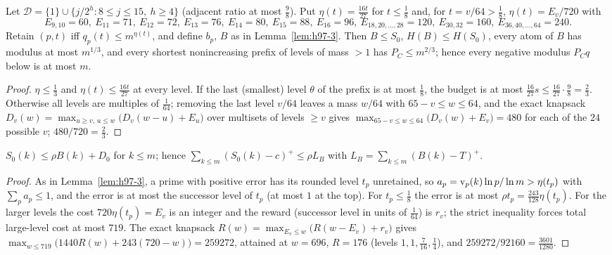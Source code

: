 \begin{lemma}\label{lem:h883-3}
Let $\mathcal D=\{1\}\cup\{j/2^h:8\le j\le15,\ h\ge4\}$ (adjacent ratio at most $\tfrac98$). Put
$\eta(t)=\tfrac{16t}{27}$ for $t\le\tfrac18$ and, for $t=v/64>\tfrac18$, $\eta(t)=E_v/720$ with
\[
E_{9,10}=60,\ E_{11}=71,\ E_{12}=72,\ E_{13}=76,\ E_{14}=80,\ E_{15}=88,\ E_{16}=96,\
E_{18,20,\dots,28}=120,\ E_{30,32}=160,\ E_{36,40,\dots,64}=240 .
\]
Retain $(p,t)$ iff $q_p(t)\le m^{\eta(t)}$, and define $b_p$, $B$ as in Lemma~\ref{lem:h97-3}. Then $B\le S_0$,
$H(B)\le H(S_0)$, every atom of $B$ has modulus at most $m^{1/3}$, and every shortest nonincreasing prefix of levels of
mass $>1$ has $P_C\le m^{2/3}$; hence every negative modulus $P_Cq$ below is at most $m$.
\end{lemma}
\begin{proof}
$\eta\le\tfrac13$ and $\eta(t)\le\tfrac{16t}{27}$ at every level. If the last (smallest) level $\theta$ of the prefix is
at most $\tfrac18$, the budget is at most $\tfrac{16}{27}s\le\tfrac{16}{27}\cdot\tfrac98=\tfrac23$. Otherwise all
levels are multiples of $\tfrac1{64}$; removing the last level $v/64$ leaves a mass $w/64$ with $65-v\le w\le64$, and
the exact knapsack $D_v(w)=\max_{u\ge v,\,u\le w}\bigl(D_v(w-u)+E_u\bigr)$ over multisets of levels $\ge v$ gives
$\max_{65-v\le w\le64}\bigl(D_v(w)+E_v\bigr)=480$ for each of the $24$ possible $v$; $480/720=\tfrac23$.
\end{proof}

\begin{lemma}\label{lem:h883-4}
$S_0(k)\le\rho B(k)+D_0$ for $k\le m$; hence $\sum_{k\le m}(S_0(k)-c)^+\le\rho L_B$ with
$L_B=\sum_{k\le m}(B(k)-T)^+$.
\end{lemma}
\begin{proof}
As in Lemma~\ref{lem:h97-3}, a prime with positive error has its rounded level $t_p$ unretained, so
$a_p=\operatorname{v}_p(k)\ln p/\ln m>\eta(t_p)$ with $\sum_pa_p\le1$, and the error is at most the successor level of $t_p$
(at most $1$ at the top). For $t_p\le\tfrac18$ the error is at most $\rho t_p=\tfrac{243}{128}\eta(t_p)$. For the
larger levels the cost $720\eta(t_p)=E_v$ is an integer and the reward (successor level in units of $\tfrac1{64}$) is
$r_v$; the strict inequality forces total large-level cost at most $719$. The exact knapsack
$R(w)=\max_{E_v\le w}\bigl(R(w-E_v)+r_v\bigr)$ gives $\max_{w\le719}\bigl(1440R(w)+243(720-w)\bigr)=259272$,
attained at $w=696$, $R=176$ (levels $1,1,\tfrac7{16},\tfrac14$), and $259272/92160=\tfrac{3601}{1280}$.
\end{proof}

